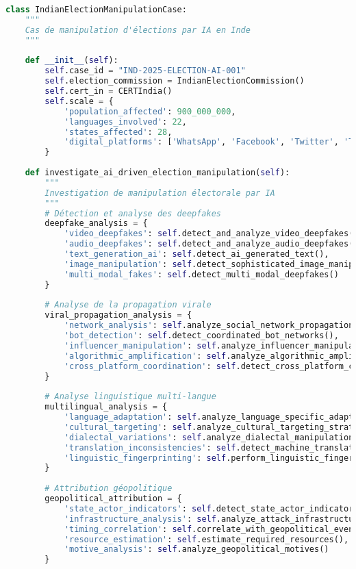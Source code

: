 \begin{lstlisting}[language=Python, caption=Investigation de manipulation électorale par IA]
class IndianElectionManipulationCase:
    """
    Cas de manipulation d'élections par IA en Inde
    """
    
    def __init__(self):
        self.case_id = "IND-2025-ELECTION-AI-001"
        self.election_commission = IndianElectionCommission()
        self.cert_in = CERTIndia()
        self.scale = {
            'population_affected': 900_000_000,
            'languages_involved': 22,
            'states_affected': 28,
            'digital_platforms': ['WhatsApp', 'Facebook', 'Twitter', 'TikTok', 'YouTube']
        }
        
    def investigate_ai_driven_election_manipulation(self):
        """
        Investigation de manipulation électorale par IA
        """
        # Détection et analyse des deepfakes
        deepfake_analysis = {
            'video_deepfakes': self.detect_and_analyze_video_deepfakes(),
            'audio_deepfakes': self.detect_and_analyze_audio_deepfakes(),
            'text_generation_ai': self.detect_ai_generated_text(),
            'image_manipulation': self.detect_sophisticated_image_manipulation(),
            'multi_modal_fakes': self.detect_multi_modal_deepfakes()
        }
        
        # Analyse de la propagation virale
        viral_propagation_analysis = {
            'network_analysis': self.analyze_social_network_propagation(),
            'bot_detection': self.detect_coordinated_bot_networks(),
            'influencer_manipulation': self.analyze_influencer_manipulation(),
            'algorithmic_amplification': self.analyze_algorithmic_amplification(),
            'cross_platform_coordination': self.detect_cross_platform_coordination()
        }
        
        # Analyse linguistique multi-langue
        multilingual_analysis = {
            'language_adaptation': self.analyze_language_specific_adaptations(),
            'cultural_targeting': self.analyze_cultural_targeting_strategies(),
            'dialectal_variations': self.analyze_dialectal_manipulation_variations(),
            'translation_inconsistencies': self.detect_machine_translation_artifacts(),
            'linguistic_fingerprinting': self.perform_linguistic_fingerprinting()
        }
        
        # Attribution géopolitique
        geopolitical_attribution = {
            'state_actor_indicators': self.detect_state_actor_indicators(),
            'infrastructure_analysis': self.analyze_attack_infrastructure(),
            'timing_correlation': self.correlate_with_geopolitical_events(),
            'resource_estimation': self.estimate_required_resources(),
            'motive_analysis': self.analyze_geopolitical_motives()
        }
        

\end{lstlisting}
